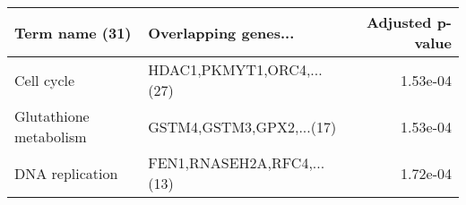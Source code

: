 \begin{tabular}{llr}
\toprule
        Term name (31) &       Overlapping genes... &  Adjusted p-value \\
\midrule
            Cell cycle &  HDAC1,PKMYT1,ORC4,...(27) &          1.53e-04 \\
Glutathione metabolism &   GSTM4,GSTM3,GPX2,...(17) &          1.53e-04 \\
       DNA replication & FEN1,RNASEH2A,RFC4,...(13) &          1.72e-04 \\
\bottomrule
\end{tabular}
